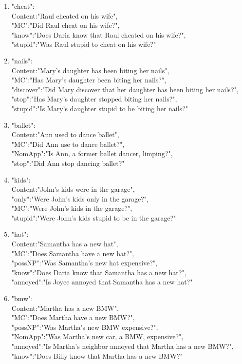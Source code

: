 \documentclass[11pt,fleqn]{article}
\newcommand{\6}{\mbox{$[\hspace*{-.6mm}[$}}
\newcommand{\9}{\mbox{$]\hspace*{-.6mm}]$}}
\begin{document}
\begin{enumerate}
\item "cheat": \\
     Content:"Raul cheated on his wife",\\
     "MC":"Did Raul cheat on his wife?",\\
     "know":"Does Daria know that Raul cheated on his wife?",\\
     "stupid":"Was Raul stupid to cheat on his wife?"

\item "nails": \\
     Content:"Mary's daughter has been biting her nails",\\
     "MC":"Has Mary's daughter been biting her nails?",\\
     "discover":"Did Mary discover that her daughter has been biting her nails?",\\
     "stop":"Has Mary's daughter stopped biting her nails?",\\
     "stupid":"Is Mary's daughter stupid to be biting her nails?"

\item  "ballet": \\
     Content:"Ann used to dance ballet",\\
     "MC":"Did Ann use to dance ballet?",\\
     "NomApp":"Is Ann, a former ballet dancer, limping?",\\
     "stop":"Did Ann stop dancing ballet?"

\item "kids": \\
     Content:"John's kids were in the garage",\\
     "only":"Were John's kids only in the garage?",\\
     "MC":"Were John's kids in the garage?",\\
     "stupid":"Were John's kids stupid to be in the garage?"

\item "hat": \\
     Content:"Samantha has a new hat",\\
     "MC":"Does Samantha have a new hat?",\\
     "possNP":"Was Samantha's new hat expensive?",\\
     "know":"Does Daria know that Samantha has a new hat?",\\
     "annoyed":"Is Joyce annoyed that Samantha has a new hat?"

\item "bmw": \\
     Content:"Martha has a new BMW",\\
     "MC":"Does Martha have a new BMW?",\\
     "possNP":"Was Martha's new BMW expensive?",\\
     "NomApp":"Was Martha's new car, a BMW, expensive?",\\
     "annoyed":"Is Martha's neighbor annoyed that Martha has a new BMW?",\\
     "know":"Does Billy know that Martha has a new BMW?"


\end{enumerate}
\end{document}
